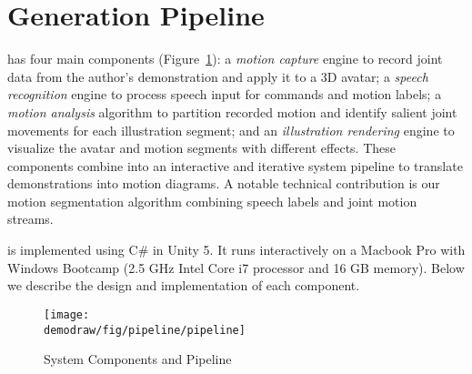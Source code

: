 
\section{Generation Pipeline}


\systemname{} has four main components (Figure~\ref{fig:pipeline}):
%
a \emph{motion capture} engine to record joint data from the author's demonstration and apply it to a 3D avatar;
%
a \emph{speech recognition} engine to process speech input for commands and motion labels;
%
a \emph{motion analysis} algorithm to partition recorded motion and identify salient joint movements for each illustration segment;
%
and an \emph{illustration rendering} engine to visualize the avatar and motion segments with different effects.
%
These components combine into an interactive and iterative system pipeline to translate demonstrations into motion diagrams.
A notable technical contribution is our motion segmentation algorithm combining speech labels and joint motion streams.

%
\systemname{} is implemented using C\# in Unity 5. %
It runs interactively on a Macbook Pro with Windows Bootcamp (2.5 GHz Intel Core i7 processor and 16 GB memory).
%
Below we describe the design and implementation of each component.

\begin{figure}[t]
  \centering
  \texttt{[image: \\demodraw/fig/pipeline/pipeline]}
  \caption{\systemname{} System Components and Pipeline}
  \label{fig:pipeline}
\end{figure}

